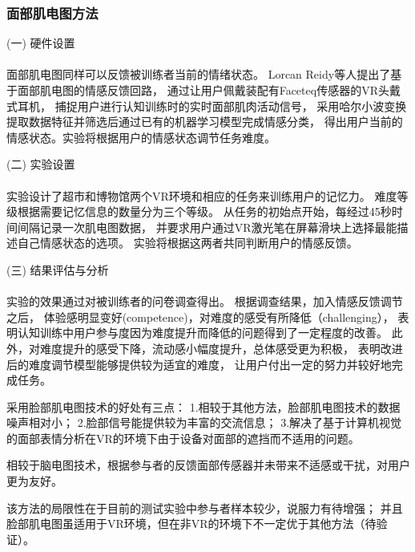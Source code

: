 \documentclass{article}
\begin{document}
            \subsubsection{面部肌电图方法}
            (一) 硬件设置\paragraph{}
            面部肌电图同样可以反馈被训练者当前的情绪状态。
            Lorcan Reidy等人提出了基于面部肌电图的情感反馈回路，
            通过让用户佩戴装配有Faceteq传感器的VR头戴式耳机，
            捕捉用户进行认知训练时的实时面部肌肉活动信号，
            采用哈尔小波变换提取数据特征并筛选后通过已有的机器学习模型完成情感分类，
            得出用户当前的情感状态。实验将根据用户的情感状态调节任务难度。

            (二) 实验设置\paragraph{}
            实验设计了超市和博物馆两个VR环境和相应的任务来训练用户的记忆力。
            难度等级根据需要记忆信息的数量分为三个等级。
            从任务的初始点开始，每经过45秒时间间隔记录一次肌电图数据，
            并要求用户通过VR激光笔在屏幕滑块上选择最能描述自己情感状态的选项。
            实验将根据这两者共同判断用户的情感反馈。

            (三) 结果评估与分析\paragraph{}
            实验的效果通过对被训练者的问卷调查得出。
            根据调查结果，加入情感反馈调节之后，
            体验感明显变好(competence)，对难度的感受有所降低（challenging），
            表明认知训练中用户参与度因为难度提升而降低的问题得到了一定程度的改善。
            此外，对难度提升的感受下降，流动感小幅度提升，总体感受更为积极，
            表明改进后的难度调节模型能够提供较为适宜的难度，
            让用户付出一定的努力并较好地完成任务。

            采用脸部肌电图技术的好处有三点：
            1.相较于其他方法，脸部肌电图技术的数据噪声相对小；
            2.脸部信号能提供较为丰富的交流信息；
            3.解决了基于计算机视觉的面部表情分析在VR的环境下由于设备对面部的遮挡而不适用的问题。

            相较于脑电图技术，根据参与者的反馈面部传感器并未带来不适感或干扰，对用户更为友好。

            该方法的局限性在于目前的测试实验中参与者样本较少，说服力有待增强；
            并且脸部肌电图虽适用于VR环境，但在非VR的环境下不一定优于其他方法（待验证）。
\end{document}

